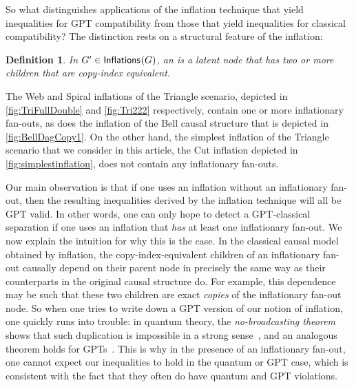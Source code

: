 \documentclass[aps,english,10pt,superscriptaddress,onecolumn,twoside,longbibliography,pra,floatfix,fleqn,nofootinbib]{revtex4-1}
\newcommand*{\tblue}[1]{{\color{MidnightBlue}{\textbf{#1}}}}
\newtheorem{definition}[theorem]{Definition}
\theoremstyle{definition}
\newcounter{example}[section]
\newcommand{\SmallNamedFunction}[3][]{\operatorname{\mathsf{#2}}_{#1}\parenths{#3}}
\newcommand{\inflations}[1]{\SmallNamedFunction{Inflations}{#1}}
\DeclarePairedDelimiter{\parenths}{\lparen}{\rparen}
\begin{document}
So what distinguishes applications of the inflation technique that yield inequalities for GPT compatibility from those that yield inequalities for classical compatibility?   The distinction rests on a structural feature of the inflation:

\begin{definition}
In $G'\in\inflations{G}$, an \tblue{inflationary fan-out} is a latent node that has two or more children that are copy-index equivalent.  
\end{definition}

 The Web and Spiral inflations of the Triangle scenario, depicted in \cref{fig:TriFullDouble} and \cref{fig:Tri222} respectively,
contain one or more inflationary fan-outs, as does the inflation of the Bell causal structure that is depicted in \cref{fig:BellDagCopy1}.  On the other hand, the simplest inflation of the Triangle scenario that we consider in this article, the Cut inflation depicted in \cref{fig:simplestinflation}, does not contain any inflationary fan-outs.

Our main observation is that if one uses an inflation without an inflationary fan-out, then the resulting inequalities derived by the inflation technique will all be GPT valid. In other words, one can only hope to detect a GPT-classical separation if one uses an inflation that \emph{has} at least one inflationary fan-out. We now explain the intuition for why this is the case. 
In the classical causal model obtained by inflation, the copy-index-equivalent children of an inflationary fan-out causally depend on their parent node in precisely the same way as their counterparts in the original causal structure do. For example, this dependence may be such that these two children are exact \emph{copies} of the inflationary fan-out node. So when one tries to write down a GPT version of our notion of inflation, one quickly runs into trouble: in quantum theory, the {\em no-broadcasting theorem} shows that such duplication is impossible in a strong sense~\cite{NoCloningQuantum1996}, and an analogous theorem holds for GPTs~\cite{NoCloningGeneral2006}. This is why in the presence of an inflationary fan-out, one cannot expect our inequalities to hold in the quantum or GPT case, which is consistent with the fact that they often do have quantum and GPT violations.
\end{document}
